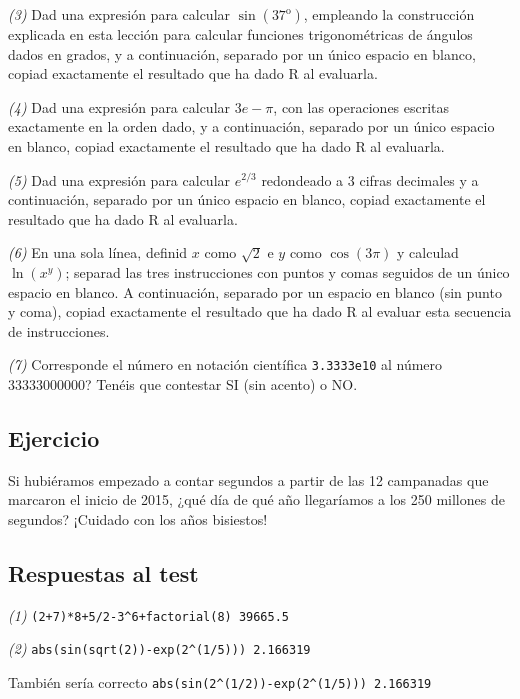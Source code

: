 \documentclass[
]{book}
\theoremstyle{definition}
\theoremstyle{definition}
\theoremstyle{definition}
\theoremstyle{remark}
\begin{document}
\emph{(3)} Dad una expresión para calcular \(\sin(37^{\mathrm{o}})\), empleando la construcción explicada en esta lección para calcular funciones trigonométricas de ángulos dados en grados, y a continuación, separado por un único espacio en blanco, copiad exactamente el resultado que ha dado R al evaluarla.

\emph{(4)} Dad una expresión para calcular \(3e-\pi\), con las operaciones escritas exactamente en la orden dado, y a continuación, separado por un único espacio en blanco, copiad exactamente el resultado que ha dado R al evaluarla.

\emph{(5)} Dad una expresión para calcular \(e^{2/3}\) redondeado a 3 cifras decimales y a continuación, separado por un único espacio en blanco, copiad exactamente el resultado que ha dado R al evaluarla.

\emph{(6)} En una sola línea, definid \(x\) como \(\sqrt{2}\) e \(y\) como \(\cos(3\pi)\) y calculad \(\ln(x^{y})\); separad las tres instrucciones con puntos y comas seguidos de un único espacio en blanco. A continuación, separado por un espacio en blanco (sin punto y coma), copiad exactamente el resultado que ha dado R al evaluar esta secuencia de instrucciones.

\emph{(7)} Corresponde el número en notación científica \texttt{3.3333e10} al número 33333000000? Tenéis que contestar SI (sin acento) o NO.

\hypertarget{ejercicio}{%
\subsection*{Ejercicio}\label{ejercicio}}

Si hubiéramos empezado a contar segundos a partir de las 12 campanadas que marcaron el inicio de 2015, ¿qué día de qué año llegaríamos a los 250 millones de segundos? ¡Cuidado con los años bisiestos!

\hypertarget{respuestas-al-test}{%
\subsection*{Respuestas al test}\label{respuestas-al-test}}

\emph{(1)} \texttt{(2+7)*8+5/2-3\^{}6+factorial(8)\ 39665.5}

\emph{(2)} \texttt{abs(sin(sqrt(2))-exp(2\^{}(1/5)))\ 2.166319}

También sería correcto \texttt{abs(sin(2\^{}(1/2))-exp(2\^{}(1/5)))\ 2.166319}
\end{document}
